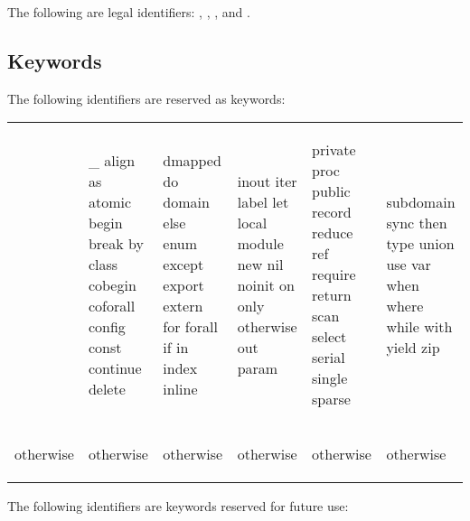 \begin{example}
The following are legal
identifiers: , ,
, and .
\end{example}

\subsection{Keywords}
\label{Keywords}

The following identifiers are reserved as keywords:

\begin{tabular}{llllll}
&
\begin{chapel}
_
align
as
atomic
begin
break
by
class
cobegin
coforall
config
const
continue
delete
\end{chapel} & \begin{chapel}
dmapped
do
domain
else
enum
except
export
extern
for
forall
if
in
index
inline
\end{chapel} & \begin{chapel}
inout
iter
label
let
local
module
new
nil
noinit
on
only
otherwise
out
param
\end{chapel} & \begin{chapel}
private
proc
public
record
reduce
ref
require
return
scan
select
serial
single
sparse
\end{chapel} & \begin{chapel}
subdomain
sync
then
type
union
use
var
when
where
while
with
yield
zip
\end{chapel} \\
\begin{invisible}
otherwise
\end{invisible} & \begin{invisible}
otherwise
\end{invisible} & \begin{invisible}
otherwise
\end{invisible} & \begin{invisible}
otherwise
\end{invisible} & \begin{invisible}
otherwise
\end{invisible} & \begin{invisible}
otherwise
\end{invisible}
\end{tabular}

The following identifiers are keywords reserved for future use:

